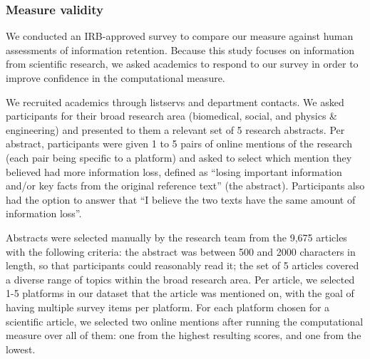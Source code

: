\documentclass[letterpaper]{article} %
\begin{document}
\subsubsection{Measure validity}
We conducted an IRB-approved survey to compare our measure against human assessments of information retention. Because this study focuses on information from scientific research, we asked academics to respond to our survey in order to improve confidence in the computational measure.

We recruited academics through listservs and department contacts. We asked participants for their broad research area (biomedical, social, and physics \& engineering) and presented to them a relevant set of 5 research abstracts. Per abstract, participants were given 1 to 5 pairs of online mentions of the research (each pair being specific to a platform) and asked to select which mention they believed had more information loss, defined as ``losing important information and/or key facts from the original reference text'' (the abstract). Participants also had the option to answer that ``I believe the two texts have the same amount of information loss''.

Abstracts were selected manually by the research team from the 9,675 articles with the following criteria: the abstract was between 500 and 2000 characters in length, so that participants could reasonably read it; the set of 5 articles covered a diverse range of topics within the broad research area. 
Per article, we selected 1-5 platforms in our dataset that the article was mentioned on, with the goal of having multiple survey items per platform. For each platform chosen for a scientific article, we selected two online mentions after running the computational measure over all of them: one from the highest resulting scores, and one from the lowest. %
\end{document}
